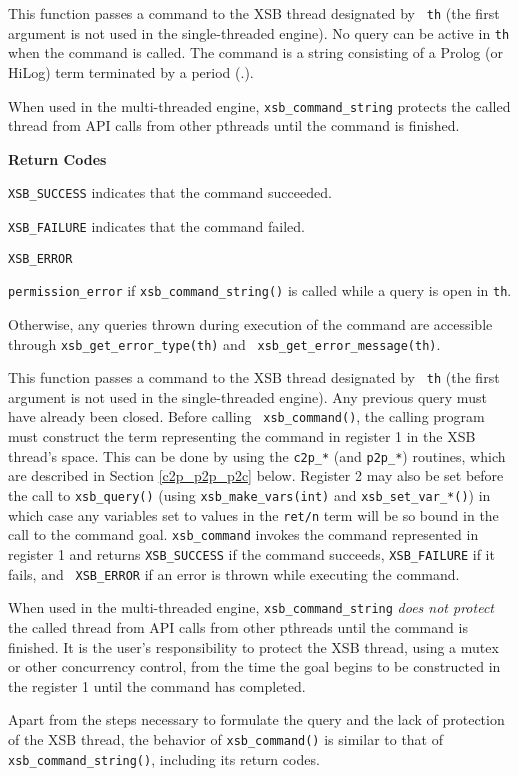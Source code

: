 \begin{description}
%
This function passes a command to the XSB thread designated by {\tt
  th} (the first argument is not used in the single-threaded engine).
No query can be active in {\tt th} when the command is called.  The
command is a string consisting of a Prolog (or HiLog) term terminated
by a period (.).

When used in the multi-threaded engine, {\tt xsb\_command\_string}
protects the called thread from API calls from other pthreads until
the command is finished.

{\bf Return Codes}  
\bi
\item {\tt XSB\_SUCCESS} indicates that the command succeeded.
%
\item {\tt XSB\_FAILURE} indicates that the command failed.
%
\item {\tt XSB\_ERROR} 
\bi
\item {\tt permission\_error} if {\tt xsb\_command\_string()} is
  called while a query is open in {\tt th}.
%
\item Otherwise, any queries thrown during execution of the command
  are accessible through {\tt xsb\_get\_error\_type(th)} and {\tt
    xsb\_get\_error\_message(th)}.
\ei
%
\ei

%
This function passes a command to the XSB thread designated by {\tt
  th} (the first argument is not used in the single-threaded engine).
Any previous query must have already been closed.  Before calling {\tt
  xsb\_command()}, the calling program must construct the term
representing the command in register 1 in the XSB thread's space.
This can be done by using the {\tt c2p\_*} (and {\tt p2p\_*})
routines, which are described in Section \ref{c2p_p2p_p2c} below.
Register 2 may also be set before the call to {\tt xsb\_query()}
(using {\tt xsb\_make\_vars(int)} and {\tt xsb\_set\_var\_*()}) in
which case any variables set to values in the {\tt ret/n} term will be
so bound in the call to the command goal.  {\tt xsb\_command} invokes
the command represented in register 1 and returns {\tt XSB\_SUCCESS}
if the command succeeds, {\tt XSB\_FAILURE} if it fails, and {\tt
  XSB\_ERROR} if an error is thrown while executing the command.

When used in the multi-threaded engine, {\tt xsb\_command\_string}
{\em does not protect} the called thread from API calls from other
pthreads until the command is finished.  It is the user's
responsibility to protect the XSB thread, using a mutex or other
concurrency control, from the time the goal begins to be constructed
in the register 1 until the command has completed.

Apart from the steps necessary to formulate the query and the lack of
protection of the XSB thread, the behavior of {\tt xsb\_command()} is
similar to that of {\tt xsb\_command\_string()}, including its return
codes.
\end{description}


